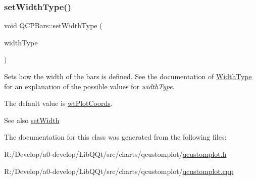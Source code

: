 \subsubsection{\texorpdfstring{set\+Width\+Type()}{setWidthType()}}
{\footnotesize\ttfamily void Q\+C\+P\+Bars\+::set\+Width\+Type (\begin{DoxyParamCaption}\item[{\mbox{\hyperlink{class_q_c_p_bars_a65dbbf1ab41cbe993d71521096ed4649}{Q\+C\+P\+Bars\+::\+Width\+Type}}}]{width\+Type }\end{DoxyParamCaption})}

Sets how the width of the bars is defined. See the documentation of \mbox{\hyperlink{class_q_c_p_bars_a65dbbf1ab41cbe993d71521096ed4649}{Width\+Type}} for an explanation of the possible values for {\itshape width\+Type}.

The default value is \mbox{\hyperlink{class_q_c_p_bars_a65dbbf1ab41cbe993d71521096ed4649aad3cc60ae1bfb1160a30237bee9eaf10}{wt\+Plot\+Coords}}.

\begin{DoxySeeAlso}{See also}
\mbox{\hyperlink{class_q_c_p_bars_afec6116579d44d5b706e0fa5e5332507}{set\+Width}} 
\end{DoxySeeAlso}


The documentation for this class was generated from the following files\+:\begin{DoxyCompactItemize}
\item 
R\+:/\+Develop/a0-\/develop/\+Lib\+Q\+Qt/src/charts/qcustomplot/\mbox{\hyperlink{qcustomplot_8h}{qcustomplot.\+h}}\item 
R\+:/\+Develop/a0-\/develop/\+Lib\+Q\+Qt/src/charts/qcustomplot/\mbox{\hyperlink{qcustomplot_8cpp}{qcustomplot.\+cpp}}\end{DoxyCompactItemize}
